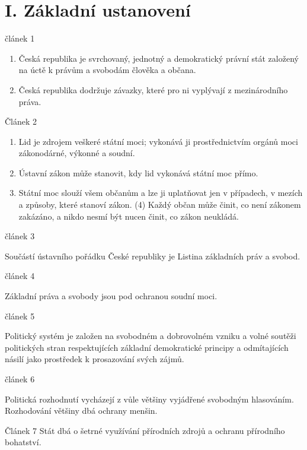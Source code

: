 \documentclass[10pt,a4paper,
twoside,%
]{report}
\begin{document}
\section[I. hlava]{I. Základní ustanovení}
\begin{center} článek 1
\end{center}
\begin{enumerate} 
\item Česká republika je svrchovaný, jednotný a demokratický právní stát založený na úctě k právům a svobodám člověka a občana.
\item Česká republika dodržuje závazky, které pro ni vyplývají z mezinárodního práva.

\end{enumerate} \begin{center}
Článek 2
\end{center}
\begin{enumerate} \item Lid je zdrojem veškeré státní moci; vykonává ji prostřednictvím orgánů moci zákonodárné, výkonné a soudní.
\item Ústavní zákon může stanovit, kdy lid vykonává státní moc přímo.
\item Státní moc slouží všem občanům a lze ji uplatňovat jen v případech, v mezích a způsoby, které stanoví zákon.
(4) Každý občan může činit, co není zákonem zakázáno, a nikdo nesmí být nucen činit, co zákon neukládá.
\end{enumerate} \begin{center} článek 3\end{center}
Součástí ústavního pořádku České republiky je Listina základních práv a svobod.
 \begin{center} článek 4\end{center}
Základní práva a svobody jsou pod ochranou soudní moci.
\begin{center}  článek 5 \end{center}
Politický systém je založen na svobodném a dobrovolném vzniku a volné soutěži politických stran respektujících základní demokratické principy a odmítajících násilí
jako prostředek k prosazování svých zájmů.
 \begin{center} článek 6\end{center}
Politická rozhodnutí vycházejí z vůle většiny vyjádřené svobodným hlasováním. Rozhodování většiny dbá ochrany menšin.
 \begin{center}  Článek 7
Stát dbá o šetrné využívání přírodních zdrojů a ochranu přírodního bohatství.


\end{center}
\end{document}

